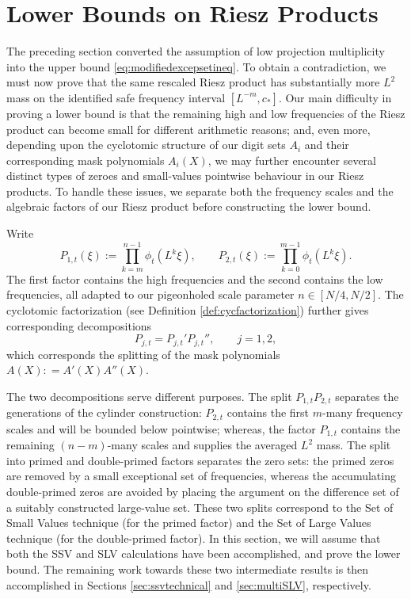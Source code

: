 \documentclass[12pt]{amsart}
\numberwithin{equation}{section}
\begin{document}
\section{Lower Bounds on Riesz Products}\label{sec:rieszproductbounds}

The preceding section converted the assumption of low projection multiplicity into the upper bound \eqref{eq:modifiedexcepsetineq}. To obtain a contradiction, we must now prove that the same rescaled Riesz product has substantially more $L^2$ mass on the identified safe frequency interval $[L^{-m}, c_*]$. Our main difficulty in proving a lower bound is that the remaining high and low frequencies of the Riesz product can become small for different arithmetic reasons; and, even more, depending upon the cyclotomic structure of our digit sets $A_i$ and their corresponding mask polynomials $A_i (X)$, we may further encounter several distinct types of zeroes and small-values pointwise behaviour in our Riesz products. To handle these issues, we separate both the frequency scales and the algebraic factors of our Riesz product before constructing the lower bound.

Write
\[
 P_{1,t}(\xi):=\prod_{k=m}^{n-1}\phi_t(L^k\xi),
 \qquad
 P_{2,t}(\xi):=\prod_{k=0}^{m-1}\phi_t(L^k\xi).
\]
The first factor contains the high frequencies and the second contains the low
frequencies, all adapted to our pigeonholed scale parameter $n \in [N/4, N/2]$.  The cyclotomic factorization (see Definition \ref{def:cycfactorization}) further gives corresponding decompositions
\[
 P_{j,t}=P_{j,t}'P_{j,t}'',
 \qquad j=1,2,
\]
which corresponds the splitting of the mask polynomials $A(X) : = A' (X) A'' (X)$.

The two decompositions serve different purposes. The split $P_{1,t}P_{2,t}$ separates the generations of the cylinder construction: $P_{2,t}$ contains the first $m$-many frequency scales and will be bounded below pointwise; whereas, the factor $P_{1,t}$ contains the remaining $(n-m)$-many scales and supplies the averaged $L^2$ mass. The split into primed and double-primed factors separates the zero sets: the primed zeros are removed by a small exceptional set of frequencies, whereas the accumulating double-primed zeros are avoided by placing the argument on the difference set of a suitably constructed large-value set. These two splits correspond to the Set of Small Values technique (for the primed factor) and the Set of Large Values technique (for the double-primed factor). In this section, we will assume that both the SSV and SLV calculations have been accomplished, and prove the lower bound. The remaining work towards these two intermediate results is then accomplished in Sections \ref{sec:ssvtechnical} and \ref{sec:multiSLV}, respectively.
\end{document}
